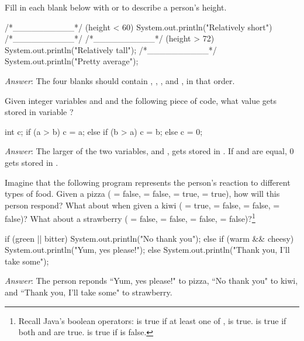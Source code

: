 \begin{example}
Fill in each blank below with  or  to describe a person's height.

\begin{code}
/*__________*/ (height < 60) {
    System.out.println("Relatively short")
} /*__________*/ {
    /*__________*/ (height > 72) {
        System.out.println("Relatively tall");
    } /*__________*/ {
        System.out.println("Pretty average");
    }
}
\end{code}

\emph{Answer}: The four blanks should contain , , , and , in that order.
\end{example}

\begin{example}
Given integer variables  and  and the following piece of code, what value gets stored in variable ?

\begin{code}
int c;
if (a > b) {
    c = a;
} else {
    if (b > a) {
        c = b;
    } else {
        c = 0;
    }
}
\end{code}

\emph{Answer}: The larger of the two variables,  and , gets stored in . If  and  are equal, 0 gets stored in .
\end{example}

\begin{example}
Imagine that the following program represents the person's reaction to different types of food. Given a pizza ( = false,  = false,  = true,  = true), how will this person respond? What about when given a kiwi ( = true,  = false,  = false,  = false)? What about a strawberry ( = false,  = false,  = false,  = false)?\footnote{Recall Java's boolean operators:  is true if at least one of ,  is true.  is true if both  and  are true.  is true if  is false.}

\begin{code}
if (green || bitter) {
    System.out.println("No thank you");
} else {
    if (warm && cheesy) {
        System.out.println("Yum, yes please!");
    } else {
        System.out.println("Thank you, I'll take some");
    }
}
\end{code}
\emph{Answer}: The person reponds ``Yum, yes please!" to pizza, ``No thank you" to kiwi, and ``Thank you, I'll take some" to strawberry.
\end{example}

